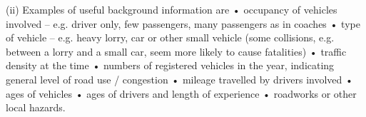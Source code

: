 \documentclass[a4paper,12pt]{article}
\begin{document}
 
 
(ii) Examples of useful background information are 
 • occupancy of vehicles involved – e.g. driver only, few passengers, many passengers as in coaches • type of vehicle – e.g. heavy lorry, car or other small vehicle (some collisions, e.g. between a lorry and a small car, seem more likely to cause fatalities) • traffic density at the time • numbers of registered vehicles in the year, indicating general level of road use / congestion • mileage travelled by drivers involved • ages of vehicles • ages of drivers and length of experience • roadworks or other local hazards. 
\end{document}
